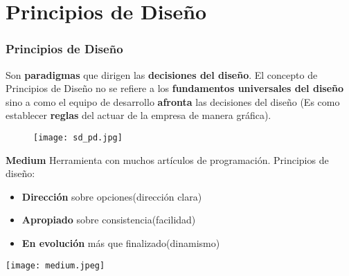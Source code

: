 \documentclass[11pt]{beamer}
\begin{document}
\section{Principios de Diseño}
\begin{frame}
\frametitle{Principios de Diseño}
\justifying \vspace{5mm} Son \textbf{paradigmas} que dirigen las \textbf{decisiones del diseño}.\newline\addlinespace
El concepto de Principios de Diseño no se refiere a los \textbf{fundamentos universales del diseño} sino a como el equipo de desarrollo \textbf{afronta} las decisiones del diseño (Es como establecer \textbf{reglas} del actuar de la empresa de manera gráfica).
\begin{figure}
  \centering
  \texttt{[image: sd\_pd.jpg]} 
\end{figure}
\end{frame}

\begin{frame}

\newline \large {\bf Medium}
\newline Herramienta con muchos artículos de programación. \newline Principios de diseño:\addlinespace
\begin{minipage}[c]{0.55\textwidth} 
\begin{itemize}
    \item {\bf Dirección} sobre opciones\newline (dirección clara)
    \item {\bf Apropiado} sobre consistencia\newline (facilidad)
    \item {\bf En evolución} más que finalizado\newline (dinamismo)
\end{itemize}
\end{minipage} 
\begin{minipage}[c]{0.40\textwidth} 
\texttt{[image: medium.jpeg]} 
\end{minipage}
\end{frame}
\end{document}
